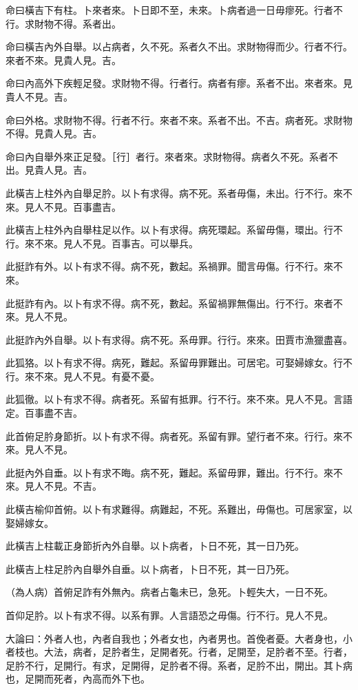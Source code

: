 \begin{pinyinscope}
命曰橫吉下有柱。卜來者來。卜日即不至，未來。卜病者過一日毋瘳死。行者不行。求財物不得。系者出。

命曰橫吉內外自舉。以占病者，久不死。系者久不出。求財物得而少。行者不行。來者不來。見貴人見。吉。

命曰內高外下疾輕足發。求財物不得。行者行。病者有瘳。系者不出。來者來。見貴人不見。吉。

命曰外格。求財物不得。行者不行。來者不來。系者不出。不吉。病者死。求財物不得。見貴人見。吉。

命曰內自舉外來正足發。［行］者行。來者來。求財物得。病者久不死。系者不出。見貴人見。吉。

此橫吉上柱外內自舉足肣。以卜有求得。病不死。系者毋傷，未出。行不行。來不來。見人不見。百事盡吉。

此橫吉上柱外內自舉柱足以作。以卜有求得。病死環起。系留毋傷，環出。行不行。來不來。見人不見。百事吉。可以舉兵。

此挺詐有外。以卜有求不得。病不死，數起。系禍罪。聞言毋傷。行不行。來不來。

此挺詐有內。以卜有求不得。病不死，數起。系留禍罪無傷出。行不行。來者不來。見人不見。

此挺詐內外自舉。以卜有求得。病不死。系毋罪。行行。來來。田賈市漁獵盡喜。

此狐狢。以卜有求不得。病死，難起。系留毋罪難出。可居宅。可娶婦嫁女。行不行。來不來。見人不見。有憂不憂。

此狐徹。以卜有求不得。病者死。系留有抵罪。行不行。來不來。見人不見。言語定。百事盡不吉。

此首俯足肣身節折。以卜有求不得。病者死。系留有罪。望行者不來。行行。來不來。見人不見。

此挺內外自垂。以卜有求不晦。病不死，難起。系留毋罪，難出。行不行。來不來。見人不見。不吉。

此橫吉榆仰首俯。以卜有求難得。病難起，不死。系難出，毋傷也。可居家室，以娶婦嫁女。

此橫吉上柱載正身節折內外自舉。以卜病者，卜日不死，其一日乃死。

此橫吉上柱足肣內自舉外自垂。以卜病者，卜日不死，其一日乃死。

（為人病）首俯足詐有外無內。病者占龜未已，急死。卜輕失大，一日不死。

首仰足肣。以卜有求不得。以系有罪。人言語恐之毋傷。行不行。見人不見。

大論曰：外者人也，內者自我也；外者女也，內者男也。首俛者憂。大者身也，小者枝也。大法，病者，足肣者生，足開者死。行者，足開至，足肣者不至。行者，足肣不行，足開行。有求，足開得，足肣者不得。系者，足肣不出，開出。其卜病也，足開而死者，內高而外下也。


\end{pinyinscope}